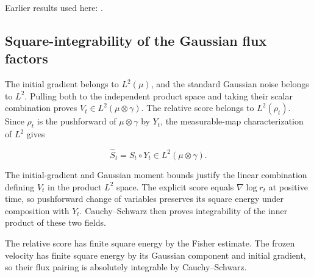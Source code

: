\documentclass[11pt,a4paper]{report}
\begin{document}
Earlier results used here: \cite[Section~3.34.1]{LangevinLean2026ULASC}.
\subsection{\texorpdfstring{Square-integrability of the Gaussian flux factors}{Square-integrability of the Gaussian flux factors}}
\label{report-step-UnadjustedLangevin-LSI-GaussianEntropyIdentity-lean-13}


The initial gradient belongs to \(L^2(\mu)\), and the standard Gaussian noise belongs to \(L^2\). Pulling both to the independent product space and taking their scalar combination proves \(V_t\in L^2(\mu\otimes\gamma)\). The relative score belongs to \(L^2(\rho_t)\). Since \(\rho_t\) is the pushforward of \(\mu\otimes\gamma\) by \(Y_t\), the measurable-map characterization of \(L^2\) gives

\[\widehat S_t=S_t\circ Y_t\in L^2(\mu\otimes\gamma).\]

The initial-gradient and Gaussian moment bounds justify the linear combination defining \(V_t\) in the product \(L^2\) space. The explicit score equals \(\nabla\log r_t\) at positive time, so pushforward change of variables preserves its square energy under composition with \(Y_t\). Cauchy–Schwarz then proves integrability of the inner product of these two fields.



The relative score has finite square energy by the Fisher estimate. The frozen velocity has finite square energy by its Gaussian component and initial gradient, so their flux pairing is absolutely integrable by Cauchy–Schwarz.
\end{document}
